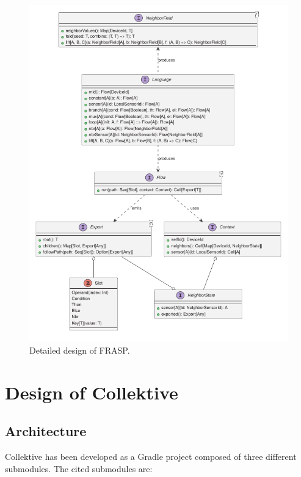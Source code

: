 \begin{figure}
    \centering
    \includegraphics[width=\linewidth]{figures/FRASP-design.pdf}
    \caption{Detailed design of FRASP.}
    \label{fig:frasp-design}
\end{figure}

\section{Design of Collektive}
\label{section:design-of-collektive}

\subsection{Architecture}
\label{subsection:collektive-architecture}

Collektive has been developed as a Gradle project composed of three different submodules. The cited submodules are:

